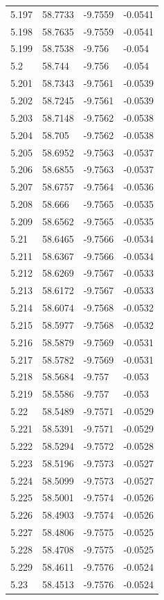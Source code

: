 \begin{tabular}{llll}
5.197 & 58.7733 & -9.7559 & -0.0541 \\
5.198 & 58.7635 & -9.7559 & -0.0541 \\
5.199 & 58.7538 & -9.756 & -0.054 \\
5.2 & 58.744 & -9.756 & -0.054 \\
5.201 & 58.7343 & -9.7561 & -0.0539 \\
5.202 & 58.7245 & -9.7561 & -0.0539 \\
5.203 & 58.7148 & -9.7562 & -0.0538 \\
5.204 & 58.705 & -9.7562 & -0.0538 \\
5.205 & 58.6952 & -9.7563 & -0.0537 \\
5.206 & 58.6855 & -9.7563 & -0.0537 \\
5.207 & 58.6757 & -9.7564 & -0.0536 \\
5.208 & 58.666 & -9.7565 & -0.0535 \\
5.209 & 58.6562 & -9.7565 & -0.0535 \\
5.21 & 58.6465 & -9.7566 & -0.0534 \\
5.211 & 58.6367 & -9.7566 & -0.0534 \\
5.212 & 58.6269 & -9.7567 & -0.0533 \\
5.213 & 58.6172 & -9.7567 & -0.0533 \\
5.214 & 58.6074 & -9.7568 & -0.0532 \\
5.215 & 58.5977 & -9.7568 & -0.0532 \\
5.216 & 58.5879 & -9.7569 & -0.0531 \\
5.217 & 58.5782 & -9.7569 & -0.0531 \\
5.218 & 58.5684 & -9.757 & -0.053 \\
5.219 & 58.5586 & -9.757 & -0.053 \\
5.22 & 58.5489 & -9.7571 & -0.0529 \\
5.221 & 58.5391 & -9.7571 & -0.0529 \\
5.222 & 58.5294 & -9.7572 & -0.0528 \\
5.223 & 58.5196 & -9.7573 & -0.0527 \\
5.224 & 58.5099 & -9.7573 & -0.0527 \\
5.225 & 58.5001 & -9.7574 & -0.0526 \\
5.226 & 58.4903 & -9.7574 & -0.0526 \\
5.227 & 58.4806 & -9.7575 & -0.0525 \\
5.228 & 58.4708 & -9.7575 & -0.0525 \\
5.229 & 58.4611 & -9.7576 & -0.0524 \\
5.23 & 58.4513 & -9.7576 & -0.0524 \\

\end{tabular}
